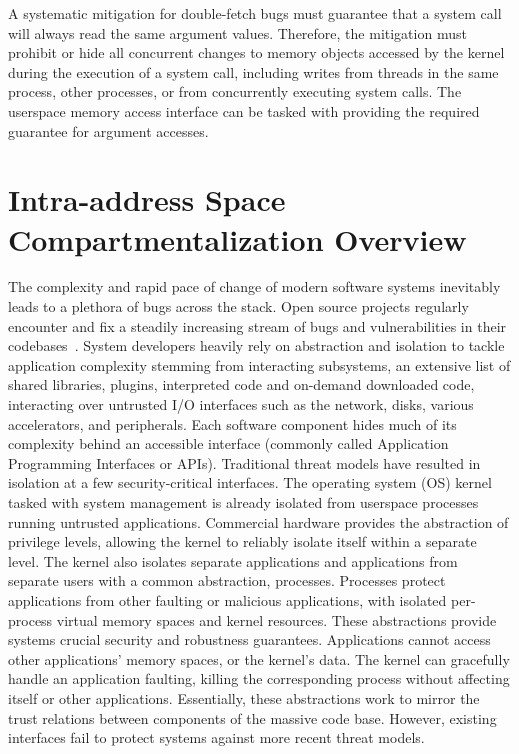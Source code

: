 A systematic mitigation for double-fetch bugs must guarantee that a system call
will always read the same argument values.
Therefore, the mitigation must prohibit or hide all 
concurrent changes to memory objects accessed by the kernel 
during the execution of a system call, 
including writes from threads in the same process, other processes, 
or from concurrently executing system calls.
The userspace memory access interface can be tasked with providing
the required guarantee for argument accesses.

\section{Intra-address Space Compartmentalization Overview}

The complexity and rapid pace of change of modern software systems inevitably
leads to a plethora of bugs across the stack.
Open source projects regularly encounter and fix a steadily increasing stream
of bugs and vulnerabilities in their 
codebases~\cite{kernelbugs, browserwildbugs,vrprewards}.
System developers heavily rely on abstraction and isolation to tackle
application complexity stemming from interacting subsystems, 
an extensive list of shared libraries, 
plugins, interpreted code and on-demand downloaded code, interacting over 
untrusted I/O interfaces such as the network, disks, 
various accelerators, and peripherals.
Each software component hides much of its complexity behind an accessible
interface (commonly called Application Programming Interfaces or APIs).
Traditional threat models have resulted in isolation at a few 
security-critical interfaces.
The operating system (OS) kernel tasked with system management is already
isolated from userspace processes running untrusted applications.
Commercial hardware provides the abstraction of privilege levels, 
allowing the kernel to reliably isolate itself within a separate level.
The kernel also isolates separate applications and applications from
separate users with a common abstraction, processes.
Processes protect applications from other faulting or malicious applications,
with isolated per-process virtual memory spaces and kernel resources.
These abstractions provide systems crucial security and robustness 
guarantees.
Applications cannot access other applications' memory spaces, or the
kernel's data.
The kernel can gracefully handle an application faulting, killing the
corresponding process without affecting itself or other applications.
Essentially, these abstractions work to mirror the trust relations between
components of the massive code base.
However, existing interfaces fail to protect systems against more recent
threat models.

